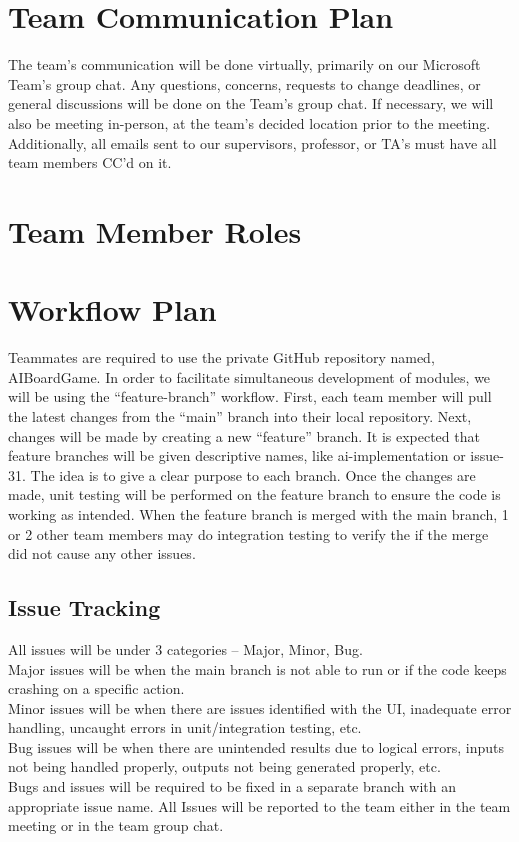 \documentclass{article}
\begin{document}
\section{Team Communication Plan}
The team’s communication will be done virtually, primarily on our Microsoft Team’s group chat. Any questions, concerns, requests to change deadlines, or general discussions will be done on the Team’s group chat. If necessary, we will also be meeting in-person, at the team’s decided location prior to the meeting. 
Additionally, all emails sent to our supervisors, professor, or TA’s must have all team members CC’d on it.
\section{Team Member Roles}

\section{Workflow Plan}
Teammates are required to use the private GitHub repository named, AIBoardGame. 
In order to facilitate simultaneous development of modules, we will be using the “feature-branch” workflow. First, each team member will pull the latest changes from the “main” branch into their local repository. 
Next, changes will be made by creating a new “feature” branch. It is expected that feature branches will be given descriptive names, like ai-implementation or issue-31. The idea is to give a clear purpose to each branch. 
Once the changes are made, unit testing will be performed on the feature branch to ensure the code is working as intended. 
When the feature branch is merged with the main branch, 1 or 2 other team members may do integration testing to verify the if the merge did not cause any other issues. 

\subsection{Issue Tracking}
All issues will be under 3 categories – Major, Minor, Bug. 
\\Major issues will be when the main branch is not able to run or if the code keeps crashing on a specific action.
\\Minor issues will be when there are issues identified with the UI, inadequate error handling, uncaught errors in unit/integration testing, etc.
\\Bug issues will be when there are unintended results due to logical errors, inputs not being handled properly, outputs not being generated properly, etc.
\\Bugs and issues will be required to be fixed in a separate branch with an appropriate issue name. All Issues will be reported to the team either in the team meeting or in the team group chat. 
\end{document}
